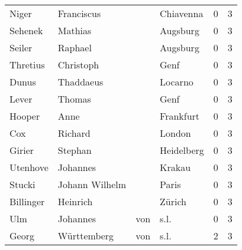 \documentclass[10pt,a4paper,landscape]{article}
\begin{document}
\begin{longtable}{llllrr}
                    Niger &                         Franciscus &             &                                   Chiavenna &          0 &         3 \\
                  Sehenek &                            Mathias &             &                                    Augsburg &          0 &         3 \\
                   Seiler &                            Raphael &             &                                    Augsburg &          0 &         3 \\
                 Thretius &                          Christoph &             &                                        Genf &          0 &         3 \\
                    Dunus &                          Thaddaeus &             &                                     Locarno &          0 &         3 \\
                    Lever &                             Thomas &             &                                        Genf &          0 &         3 \\
                   Hooper &                               Anne &             &                                   Frankfurt &          0 &         3 \\
                      Cox &                            Richard &             &                                      London &          0 &         3 \\
                   Girier &                            Stephan &             &                                  Heidelberg &          0 &         3 \\
                 Utenhove &                           Johannes &             &                                      Krakau &          0 &         3 \\
                   Stucki &                     Johann Wilhelm &             &                                       Paris &          0 &         3 \\
                Billinger &                           Heinrich &             &                                      Zürich &          0 &         3 \\
                      Ulm &                           Johannes &         von &                                        s.l. &          0 &         3 \\
                    Georg &                        Württemberg &         von &                                        s.l. &          2 &         3 \\

\end{longtable}
\end{document}
